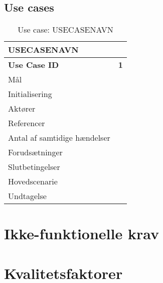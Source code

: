 \subsection{Use cases}
\begin{table}[htbp]
\centering
\begin{tabular}{|l|p{10cm}|}
\multicolumn{2}{l}{{\Large USECASENAVN}} \\\hline
\textbf{Use Case ID} &\textbf{1}\\\hline
Mål&\\\hline
Initialisering&\\\hline
Aktører&\\\hline
Referencer&\\\hline
Antal af samtidige hændelser&\\\hline
Forudsætninger&\\\hline
Slutbetingelser&\\\hline
Hovedscenarie&\\\hline
Undtagelse&\\\hline
\end{tabular}
\caption{Use case: USECASENAVN}
\label{tabel:USECASENAVN}
\end{table}

\section{Ikke-funktionelle krav}

\section{Kvalitetsfaktorer}